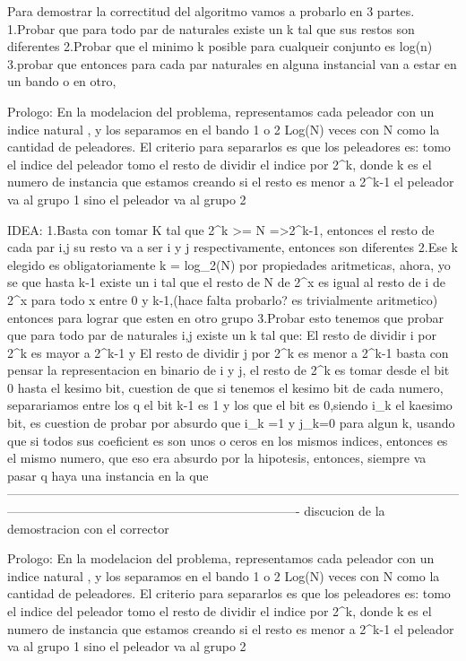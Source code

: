 Para demostrar la correctitud del algoritmo vamos a probarlo en 3 partes.
1.Probar que para todo par de naturales existe un k tal que sus restos son diferentes
2.Probar que el minimo k posible para cualqueir conjunto es log(n) 
3.probar que entonces para cada par naturales en alguna instancial van a estar en un bando o en otro, 


Prologo: En la modelacion del problema, representamos cada peleador con un indice natural , y los separamos en el bando 1 o 2 Log(N) veces con N como la cantidad de peleadores.
El criterio para separarlos es que los peleadores es:
tomo el indice del peleador
tomo el resto de dividir el indice por 2^k, donde k es el numero de instancia que estamos creando
si el resto es menor a 2^{k-1} el peleador va al  grupo 1 sino el peleador va al grupo 2

IDEA:
1.Basta con tomar K tal que 2^k >= N =>2^{k-1}, entonces el resto de cada par i,j \in [1,_,N] su resto va a ser i y j respectivamente, entonces son diferentes
2.Ese k elegido es obligatoriamente k = log_2(N) por propiedades aritmeticas, ahora, yo se que hasta k-1 existe un i tal que el resto de N de 2^x es igual al resto de i de 2^x para todo x entre 0 y k-1,(hace falta probarlo? es trivialmente aritmetico) entonces para lograr que esten en otro grupo
3.Probar esto tenemos que probar que para todo par de naturales  i,j existe un k tal que:
	El resto de dividir i por 2^k es mayor a 2^{k-1} y El resto de dividir j por 2^k es menor a 2^{k-1}  
basta con pensar la representacion en binario de i y j, el resto de 2^k es tomar desde el bit 0 hasta el kesimo bit, cuestion de que si tenemos el kesimo bit de cada numero, separariamos entre los q el bit k-1 es 1 y los que el bit es 0,siendo i_k el kaesimo bit, es cuestion de probar por absurdo que  i_k =1 y j_k=0 para algun k, usando que si todos sus coeficient es son unos o ceros en los mismos indices, entonces es el mismo numero, que eso era absurdo por la hipotesis, entonces, siempre va pasar q haya una instancia en la que 
----------------------------------------------------------------------------------------------------------------------------------------------------------------------------------
discucion de la demostracion con el corrector

Prologo: En la modelacion del problema, representamos cada peleador con un indice natural , y los separamos en el bando 1 o 2 Log(N) veces con N como la cantidad de peleadores.
El criterio para separarlos es que los peleadores es:
tomo el indice del peleador
tomo el resto de dividir el indice por 2^k, donde k es el numero de instancia que estamos creando
si el resto es menor a 2^{k-1} el peleador va al  grupo 1 sino el peleador va al grupo 2


